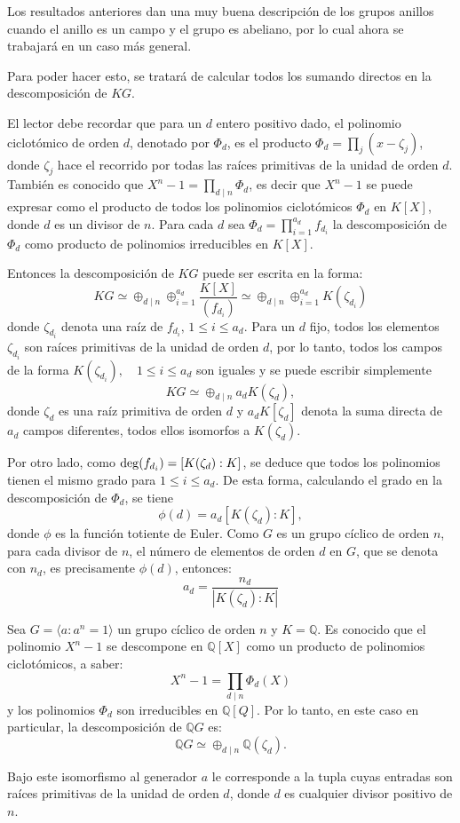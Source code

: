 Los resultados anteriores dan una muy buena descripción de los grupos anillos cuando el anillo es un campo y el grupo es abeliano, por lo cual ahora se trabajará en un caso más general. 


Para poder hacer esto, se tratará de calcular todos los sumando directos en la descomposición de $KG$.  

El lector debe recordar que para un $d$ entero positivo dado, el polinomio ciclotómico de orden $d$, denotado por $\Phi_d$, es el producto $\Phi_d = \prod_{j}(x-\zeta_j)$, donde $\zeta_j$ hace el recorrido por todas las raíces primitivas de la unidad de orden $d$. También es conocido que $X^n -1 = \prod_{d\mid n} \Phi_d $, es decir que $X^n -1 $ se puede expresar como el producto de todos los polinomios ciclotómicos $\Phi_d$ en $K[X]$, donde $d$ es un divisor de $n$. Para cada $d$ sea $\Phi_d = \prod_{i=1}^{a_d}f_{d_i}$ la descomposición de $\Phi_d$ como producto de polinomios irreducibles en $K[X]$.

Entonces la descomposición de $KG$ puede ser escrita en la forma:
\[ KG \simeq \oplus_{d \mid n} \oplus_{i=1}^{a_d} \frac{K[X]}{(f_{d_i})} \simeq \oplus_{d \mid n} \oplus_{i=1}^{a_d} K(\zeta _{d_i}) \]
donde $\zeta_{d_i}$ denota una raíz de $f_{d_i}  \mbox{, } 1 \leq i \leq a_d $. Para un $d$ fijo, todos los elementos $\zeta_{d_i}$ son raíces primitivas de la unidad de orden $d$, por lo tanto, todos los campos de la forma $K(\zeta_{d_i}), \quad 1\leq i \leq a_d$ son iguales y se puede escribir simplemente 
\[ KG \simeq \oplus_{d \mid n} a_dK(\zeta_d),\]
donde $\zeta_d$ es una raíz primitiva de orden $d$ y $a_dK[\zeta_d]$ denota la suma directa de $a_d$ campos diferentes, todos ellos isomorfos a $K(\zeta_d)$.

Por otro lado, como $\operatorname{deg}(f_{d_i}) = [K(\zeta_d):K]$, se deduce que todos los polinomios tienen el mismo grado para $1 \leq i \leq a_d$. De esta forma, calculando el grado en la descomposición de $\Phi_d$, se tiene
\[ \phi(d) = a_d[K(\zeta_d):K], \]
donde $\phi$ es la función totiente de Euler. Como $G$ es un grupo cíclico de orden $n$, para cada divisor de $n$, el número de elementos de orden $d$ en $G$, que se denota con $n_d$, es precisamente $\phi(d)$, entonces:
\[ a_d = \frac{n_d}{| K(\zeta_d) : K|}  \]
\begin{ejemplo}\label{ejem:descomposicionRacional}
Sea $G = \langle a: a^n = 1 \rangle$  un grupo cíclico de orden $n$ y $K = \mathds{Q} $. Es conocido que el polinomio $X^n-1$ se descompone en $\mathds{Q}[X]$ como un producto de polinomios ciclotómicos, a saber:
\[ X^n -1 = \prod_{d \mid n}\Phi_d(X)  \]
y los polinomios $\Phi_d$ son irreducibles en $\mathds{Q}[Q]$. Por lo tanto, en este caso en particular, la descomposición de $\mathds{Q}G$ es:
\[ \mathds{Q}G \simeq \oplus_{d\mid n} \mathds{Q}(\zeta_d).  \]

Bajo este isomorfismo al generador $a$ le corresponde a la tupla cuyas entradas son raíces primitivas de la unidad de orden $d$, donde $d$ es cualquier divisor positivo de $n$. 
\end{ejemplo}

